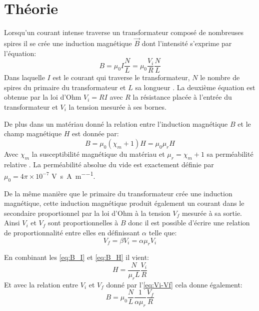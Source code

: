 \section{Théorie}

Lorsqu'un courant intense traverse un transformateur composé de nombreuses spires il se crée une induction magnétique \(\vec{B}\) dont l'intensité s'exprime par l'équation:
\begin{equation}
    B = \mu_0 I \frac{N}{L} = \mu_0 \frac{V_i}{R} \frac{N}{L}
    \label{eq:B_I}
\end{equation}
Dans laquelle \(I\) est le courant qui traverse le transformateur, \(N\) le nombre de spires du primaire du transformateur et \(L\) sa longueur \cite{assistant}. La deuxième équation est obtenue par la loi d'Ohm \(V_i = RI\) avec \(R\) la résistance placée à l'entrée du transformateur et \(V_i\) la tension mesurée à ses bornes.

De plus dans un matériau donné la relation entre l'induction magnétique \(B\) et le champ magnétique \(H\) est donnée par:
\begin{equation}
    B = \mu_0 (\chi_m + 1) H = \mu_0 \mu_r H
    \label{eq:B_H}
\end{equation}
Avec \(\chi_m\) la susceptibilité magnétique du matériau et \(\mu_r = \chi_m + 1\) sa perméabilité relative \cite{notice}. La perméabilité absolue du vide est exactement définie par \(\mu_0 = 4\pi \times 10^{-7}\) \si{\volt\second \per\ampere\per\meter}.

De la même manière que le primaire du transformateur crée une induction magnétique, cette induction magnétique produit également un courant dans le secondaire proportionnel par la loi d'Ohm à la tension \(V_f\) mesurée à sa sortie. Ainsi \(V_i\) et \(V_f\) sont proportionnelles à \(B\) donc il est possible d'écrire une relation de proportionnalité entre elles en définissant \(\alpha\) telle que:
\begin{equation}
    V_f = \beta V_i = \alpha \mu_r V_i
    \label{eq:Vi-Vf}
\end{equation}

En combinant les \autoref{eq:B_I} et \autoref{eq:B_H} il vient:
\begin{equation}
    H = \frac{N}{\mu_r L} \frac{V_i}{R}
    \label{eq:calibr_H}
\end{equation}
Et avec la relation entre \(V_i\) et \(V_f\) donné par l'\autoref{eq:Vi-Vf} cela donne également:
\begin{equation}
    B = \mu_0 \frac{N}{L} \frac{1}{\alpha \mu_r} \frac{V_f}{R}
    \label{eq:calibr_B}
\end{equation}

